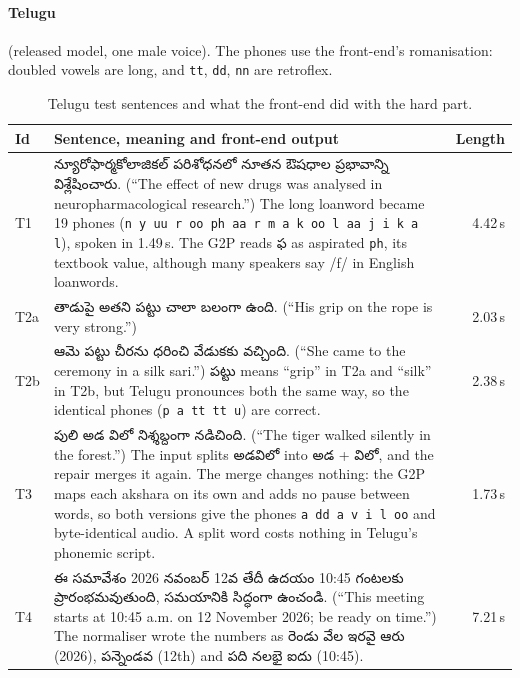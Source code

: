 \documentclass[11pt,a4paper]{article}
\newcommand{\tel}[1]{{\te #1}}
\newcommand{\code}[1]{\texttt{#1}}
\begin{document}
\paragraph{Telugu} (released model, one male voice). The phones use the front-end's romanisation: doubled vowels
are long, and \code{tt}, \code{dd}, \code{nn} are retroflex.

\begin{table}[H]\centering\small
\caption{Telugu test sentences and what the front-end did with the hard part.}
\label{tab:te-test}
\begin{tabularx}{\linewidth}{@{}l>{\raggedright\arraybackslash}Xr@{}}
\toprule
Id & Sentence, meaning and front-end output & Length \\
\midrule
T1 & \tel{న్యూరోఫార్మకోలాజికల్ పరిశోధనలో నూతన ఔషధాల ప్రభావాన్ని విశ్లేషించారు.} (``The effect of new drugs was
analysed in neuropharmacological research.'') The long loanword became 19 phones
(\code{n y uu r oo ph aa r m a k oo l aa j i k a l}), spoken in 1.49\,s. The G2P reads \tel{ఫ} as aspirated
\code{ph}, its textbook value, although many speakers say /f/ in English loanwords. & 4.42\,s \\
T2a & \tel{తాడుపై అతని పట్టు చాలా బలంగా ఉంది.} (``His grip on the rope is very strong.'') & 2.03\,s \\
T2b & \tel{ఆమె పట్టు చీరను ధరించి వేడుకకు వచ్చింది.} (``She came to the ceremony in a silk sari.'')
\tel{పట్టు} means ``grip'' in T2a and ``silk'' in T2b, but Telugu pronounces both the same way, so the identical
phones (\code{p a tt tt u}) are correct. & 2.38\,s \\
T3 & \tel{పులి అడ విలో నిశ్శబ్దంగా నడిచింది.} (``The tiger walked silently in the forest.'') The input splits
\tel{అడవిలో} into \tel{అడ} + \tel{విలో}, and the repair merges it again. The merge changes nothing: the G2P maps each
akshara on its own and adds no pause between words, so both versions give the phones \code{a dd a v i l oo} and
byte-identical audio. A split word costs nothing in Telugu's phonemic script. & 1.73\,s \\
T4 & \tel{ఈ సమావేశం 2026 నవంబర్ 12వ తేదీ ఉదయం 10:45 గంటలకు ప్రారంభమవుతుంది, సమయానికి సిద్ధంగా ఉంచండి.}
(``This meeting starts at 10:45 a.m. on 12 November 2026; be ready on time.'') The normaliser wrote the numbers
as \tel{రెండు వేల ఇరవై ఆరు} (2026), \tel{పన్నెండవ} (12th) and \tel{పది నలభై ఐదు} (10:45). & 7.21\,s \\
\bottomrule
\end{tabularx}
\end{table}
\end{document}
